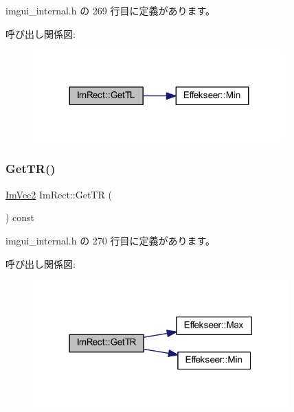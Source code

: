  imgui\+\_\+internal.\+h の 269 行目に定義があります。

呼び出し関係図\+:\nopagebreak
\begin{figure}[H]
\begin{center}
\leavevmode
\includegraphics[width=275pt]{struct_im_rect_a1d4d972329722b51dca4499cb5931b4b_cgraph}
\end{center}
\end{figure}
\mbox{\label{struct_im_rect_acae90248a96be4acf1524071fca1c3f3}} 
\subsubsection{\texorpdfstring{Get\+T\+R()}{GetTR()}}
{\footnotesize\ttfamily \mbox{\hyperlink{struct_im_vec2}{Im\+Vec2}} Im\+Rect\+::\+Get\+TR (\begin{DoxyParamCaption}{ }\end{DoxyParamCaption}) const\hspace{0.3cm}{\ttfamily [inline]}}



 imgui\+\_\+internal.\+h の 270 行目に定義があります。

呼び出し関係図\+:\nopagebreak
\begin{figure}[H]
\begin{center}
\leavevmode
\includegraphics[width=279pt]{struct_im_rect_acae90248a96be4acf1524071fca1c3f3_cgraph}
\end{center}
\end{figure}
\mbox{\label{struct_im_rect_afa75cb8491f20901c96166d17dcddac4}} 
